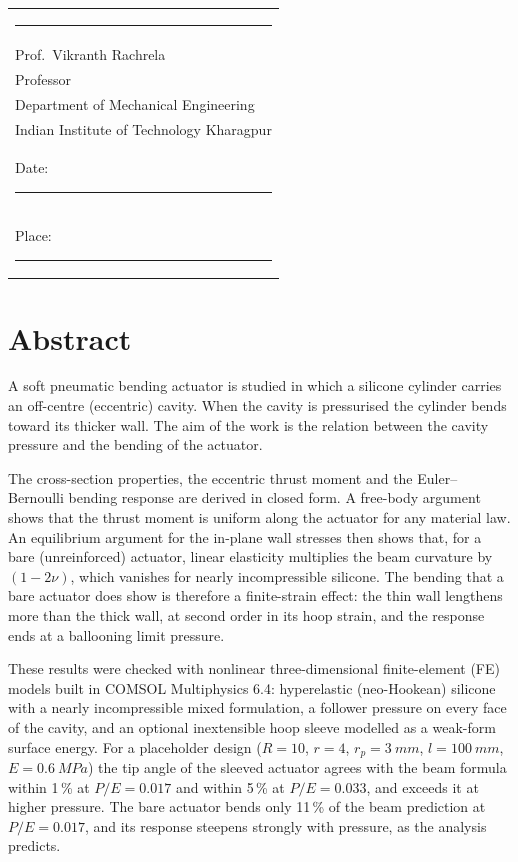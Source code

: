 \documentclass[12pt,a4paper,oneside]{report}
\numberwithin{equation}{chapter}
\numberwithin{figure}{chapter}
\numberwithin{table}{chapter}
\begin{document}
\vspace{2.5cm}
\noindent
\begin{tabular}{@{}l}
\rule{6cm}{0.4pt}\\
Prof.\ Vikranth Rachrela\\
Professor\\
Department of Mechanical Engineering\\
Indian Institute of Technology Kharagpur\\
Date: \rule{3cm}{0.4pt}\\
Place: \rule{3cm}{0.4pt}
\end{tabular}

\tableofcontents
\listoffigures
\listoftables

\chapter*{Abstract}
A soft pneumatic bending actuator is studied in which a silicone cylinder carries an off-centre
(eccentric) cavity. When the cavity is pressurised the cylinder bends toward its thicker wall. The aim of
the work is the relation between the cavity pressure and the bending of the actuator.

The cross-section properties, the eccentric thrust moment and the Euler--Bernoulli bending response are
derived in closed form. A free-body argument shows that the thrust moment is uniform along the actuator
for any material law. An equilibrium argument for the in-plane wall stresses then shows that, for a
bare (unreinforced) actuator, linear elasticity multiplies the beam curvature by $(1-2\nu)$, which
vanishes for nearly incompressible silicone. The bending that a bare actuator does show is therefore a
finite-strain effect: the thin wall lengthens more than the thick wall, at second order in its hoop
strain, and the response ends at a ballooning limit pressure.

These results were checked with nonlinear three-dimensional finite-element (FE) models built in COMSOL
Multiphysics 6.4: hyperelastic (neo-Hookean) silicone with a nearly incompressible mixed formulation, a
follower pressure on every face of the cavity, and an optional inextensible hoop sleeve modelled as a
weak-form surface energy. For a placeholder design ($R=10$, $r=4$, $r_p=\SI{3}{mm}$, $l=\SI{100}{mm}$,
$E=\SI{0.6}{MPa}$) the tip angle of the sleeved actuator agrees with the beam formula within 1\,\% at
$P/E=0.017$ and within 5\,\% at $P/E=0.033$, and exceeds it at higher pressure. The bare actuator bends only
11\,\% of the beam prediction at $P/E=0.017$, and its response steepens strongly with pressure, as the
analysis predicts.
\end{document}
